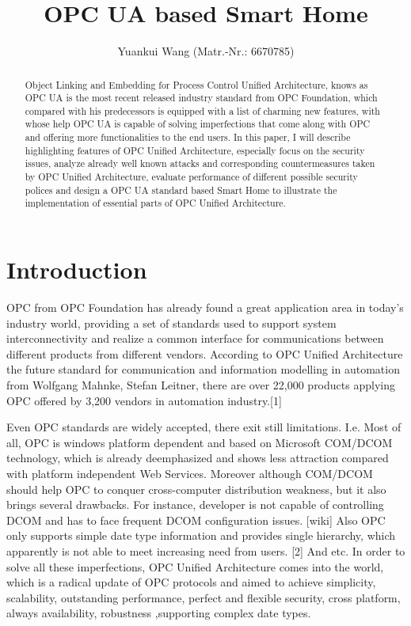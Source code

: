 \documentclass[]{llncs}
\begin{document}
\title{OPC UA based Smart Home} %
\author{Yuankui Wang (Matr.-Nr.: 6670785)}

\maketitle

\begin{abstract}

Object Linking and Embedding for Process Control Unified Architecture, knows as OPC UA is the most recent released industry standard from OPC Foundation, which compared with his predecessors is equipped with a list of charming new features, with whose help OPC UA is capable of solving imperfections that come along with OPC and offering more functionalities to the end users. In this paper, I will describe highlighting features of OPC Unified Architecture, especially focus on the security issues, analyze already well known attacks and corresponding countermeasures taken by OPC Unified Architecture, evaluate performance of different possible security polices and design a OPC UA standard based Smart Home to illustrate the implementation of essential parts of OPC Unified Architecture.  

\end{abstract}

\section{Introduction}

OPC from OPC Foundation has already found a great application area in today’s industry world, providing a set of standards used to support system interconnectivity and realize a common interface for communications between different products from different vendors. According to OPC Unified Architecture the future standard for communication and information modelling in automation from Wolfgang Mahnke, Stefan Leitner, there are over 22,000 products applying OPC offered by 3,200 vendors in automation industry.[1]


Even OPC standards are widely accepted, there exit still limitations. I.e. Most of all, OPC is windows platform dependent and based on Microsoft COM/DCOM technology, which is already deemphasized and shows less attraction compared with platform independent Web Services. Moreover although COM/DCOM should help OPC to conquer cross-computer distribution weakness, but it also brings several drawbacks. For instance, developer is not capable of controlling DCOM and has to face frequent DCOM configuration issues. [wiki] Also OPC only supports simple date type information and provides single hierarchy, which apparently is not able to meet increasing need from users. [2] And etc.
In order to solve all these imperfections, OPC Unified Architecture comes into the world, which is a radical update of OPC protocols and aimed to achieve simplicity, scalability, outstanding performance, perfect and flexible security, cross platform, always availability, robustness ,supporting complex date types.
\end{document}
